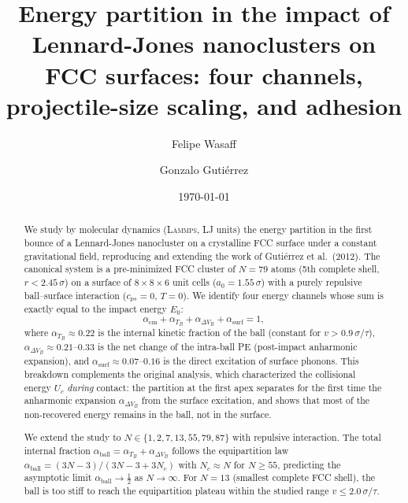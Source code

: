 \documentclass[aps,pre,twocolumn,reprint,superscriptaddress]{revtex4-2}
\newcommand{\lammps}{\textsc{Lammps}}
\begin{document}
\title{Energy partition in the impact of Lennard-Jones nanoclusters on FCC
surfaces: four channels, projectile-size scaling, and adhesion}

\author{Felipe Wasaff}

\author{Gonzalo Gutiérrez}

\date{\today}

\begin{abstract}
We study by molecular dynamics (\lammps, LJ units) the energy partition in
the first bounce of a Lennard-Jones nanocluster on a crystalline FCC surface
under a constant gravitational field, reproducing and extending the work of
Gutiérrez et al.\ (2012). The canonical system is a pre-minimized FCC
cluster of $N=79$ atoms (5th complete shell, $r < 2.45\,\sigma$) on a
surface of $8\times8\times6$ unit cells ($a_0=1.55\,\sigma$) with a purely
repulsive ball--surface interaction ($c_{ps}=0$, $T=0$). We identify four
energy channels whose sum is exactly equal to the impact energy $E_0$:
\[
    \alpha_{\mathrm{cm}} + \alpha_{T_B} + \alpha_{\Delta V_B}
    + \alpha_{\mathrm{surf}} = 1,
\]
where $\alpha_{T_B}\approx0.22$ is the internal kinetic fraction of the ball
(constant for $v>0.9\,\sigma/\tau$), $\alpha_{\Delta V_B}\approx0.21$--$0.33$
is the net change of the intra-ball PE (post-impact anharmonic expansion),
and $\alpha_{\mathrm{surf}}\approx0.07$--$0.16$ is the direct excitation of
surface phonons. This breakdown complements the original analysis, which
characterized the collisional energy $U_c$ \emph{during} contact: the
partition at the first apex separates for the first time the anharmonic
expansion $\alpha_{\Delta V_B}$ from the surface excitation, and shows that
most of the non-recovered energy remains in the ball, not in the surface.

We extend the study to $N\in\{1,2,7,13,55,79,87\}$ with repulsive
interaction. The total internal fraction
$\alpha_{\mathrm{ball}}=\alpha_{T_B}+\alpha_{\Delta V_B}$ follows the
equipartition law $\alpha_{\mathrm{ball}}=(3N-3)/(3N-3+3N_c)$ with
$N_c\approx N$ for $N\geq55$, predicting the asymptotic limit
$\alpha_{\mathrm{ball}}\to\tfrac{1}{2}$ as $N\to\infty$.
For $N=13$ (smallest complete FCC shell), the ball is too stiff to reach
the equipartition plateau within the studied range $v\leq2.0\,\sigma/\tau$.


\end{abstract}
\end{document}
